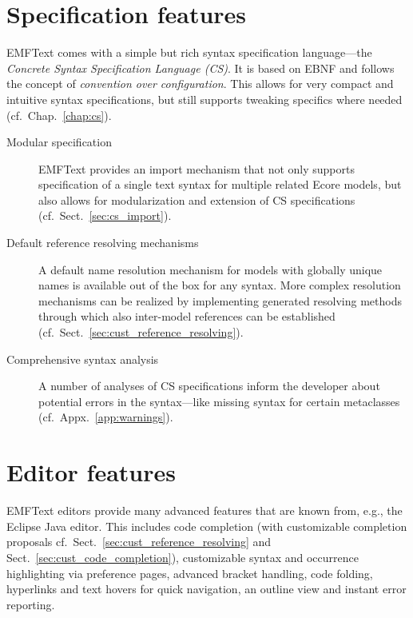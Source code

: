 \section{Specification features}

EMFText comes with a simple but rich syntax specification language---the
\emph{Concrete Syntax Specification Language (CS)}. It is based on EBNF 
and follows the concept of \emph{convention over configuration}. This 
allows for very compact and intuitive syntax specifications, but still 
supports tweaking specifics where needed (cf.~Chap.~\ref{chap:cs}).

\begin{description}

  \item[Modular specification]
        EMFText provides an import mechanism that not only supports specification 
        of a single text syntax for multiple related Ecore models, but also allows 
        for modularization and extension of CS specifications (cf.~Sect.~\ref{sec:cs_import}).

  \item[Default reference resolving mechanisms]
        A default name resolution mechanism for models with globally unique 
        names is available out of the box for any syntax. More complex resolution 
        mechanisms can be realized by implementing generated resolving methods 
        through which also inter-model references can be established 
        (cf.~Sect.~\ref{sec:cust_reference_resolving}).

  \item[Comprehensive syntax analysis]
        A number of analyses of CS specifications inform the developer about 
        potential errors in the syntax---like missing syntax for certain 
        metaclasses (cf.~Appx.~\ref{app:warnings}).

\end{description}


\section{Editor features}

EMFText editors provide many advanced features that are known from, e.g., the 
Eclipse Java editor. This includes code completion (with customizable completion
proposals cf.~Sect.~\ref{sec:cust_reference_resolving}\label{sec:cust_reference_resolving} 
and Sect.~\ref{sec:cust_code_completion}), customizable syntax and occurrence 
highlighting via preference pages, advanced bracket handling, code folding, 
hyperlinks and text hovers for quick navigation, an outline view and instant error reporting.


